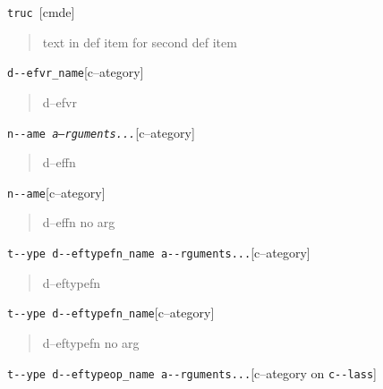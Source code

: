 \documentclass{book}
\begin{document}
\begin{titlepage}
%
\noindent\texttt{truc \EmbracOn{}\textnormal{\textsl{}}\EmbracOff{}}\hfill[cmde]



%
\begin{quote}
\unskip{\parskip=0pt\noindent}%
text in def item for second def item
\end{quote}


\noindent\texttt{d{-}{-}efvr\_name}\hfill[c--ategory]



%
\begin{quote}
\unskip{\parskip=0pt\noindent}%
d--efvr
\end{quote}

\noindent\texttt{n{-}{-}ame \EmbracOn{}\textnormal{\textsl{a--rguments...}}\EmbracOff{}}\hfill[c--ategory]



%
\begin{quote}
\unskip{\parskip=0pt\noindent}%
d--effn
\end{quote}

\noindent\texttt{n{-}{-}ame}\hfill[c--ategory]



%
\begin{quote}
\unskip{\parskip=0pt\noindent}%
d--effn no arg
\end{quote}

\noindent\texttt{t{-}{-}ype d{-}{-}eftypefn\_name a{-}{-}rguments...}\hfill[c--ategory]



%
\begin{quote}
\unskip{\parskip=0pt\noindent}%
d--eftypefn
\end{quote}

\noindent\texttt{t{-}{-}ype d{-}{-}eftypefn\_name}\hfill[c--ategory]



%
\begin{quote}
\unskip{\parskip=0pt\noindent}%
d--eftypefn no arg
\end{quote}

\noindent\texttt{t{-}{-}ype d{-}{-}eftypeop\_name a{-}{-}rguments...}\hfill[c--ategory on \texttt{c{-}{-}lass}]




\end{titlepage}
\end{document}
